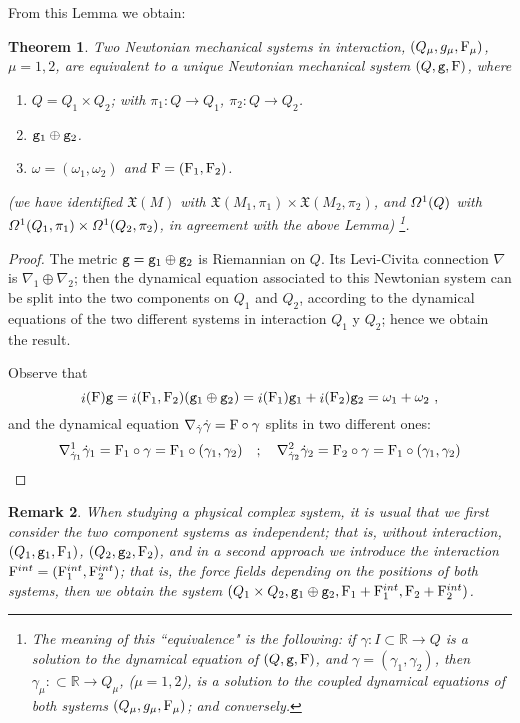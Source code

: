 \documentclass[12pt]{report}
\newtheorem{teor}{Theorem}[chapter]
\newtheorem{remark}[teor]{Remark}
\def\ben{\begin{enumerate}}
\def\een{\end{enumerate}}
\def\qed{\ifvmode\removelastskip\fi
{\unskip\nobreak\hfil\penalty50\hbox{}\nobreak\hfil
\hbox{\vrule height1.2ex width1.2ex}\parfillskip=0pt
\finalhyphendemerits=0 \par\smallskip}}
\def\vf{\mathfrak X}
\def\df{{\mit\Omega}}
\def\Real{\mathbb{R}}
\def\inn{\mathop{i}\nolimits}
\begin{document}
From this Lemma we obtain:

\begin{teor}
Two Newtonian mechanical systems in interaction,
$(Q_\mu,g_\mu,{\rm F}_\mu)$, $\mu=1,2$, are equivalent to a unique Newtonian mechanical system
 $(Q,{\tt g},{\rm F})$, where
\ben
\item
$Q=Q_1\times Q_2$; with $\pi_1\colon Q\to Q_1$, $\pi_2\colon Q\to Q_2$.
\item
${\tt g}_1\oplus {\tt g}_2$.
\item
$\omega=(\omega_1,\omega_2)$ and ${\rm F}=({\rm F}_1,{\rm F}_2)$.
\een
(we have identified
$\vf (M)$ with $\vf (M_1,\pi_1)\times\vf (M_2,\pi_2)$, and
$\df^1(Q)$ with $\df^1(Q_1,\pi_1)\times\df^1(Q_2,\pi_2)$,
in agreement with the above Lemma)
\footnote{
The meaning of this ``equivalence" is the following:
if $\gamma\colon I\subset\Real\to Q$ is a solution to the dynamical equation of $(Q,{\tt g},{\rm F})$, and $\gamma=(\gamma_1,\gamma_2)$,
then $\gamma_\mu\colon\subset\Real\to Q_\mu$, ($\mu=1,2$),
is a solution to the coupled dynamical equations of both systems $(Q_\mu,g_\mu,{\rm F}_\mu)$;
and conversely.
}.
\end{teor}
\begin{proof}
The metric ${\tt g}={\tt g}_1\oplus{\tt g}_2$ is Riemannian on $Q$. Its Levi-Civita connection $\nabla$ is $\nabla_1\oplus\nabla_2$;
then the dynamical equation associated to this Newtonian system can be split into the two components  on $Q_1$ and $Q_2$,
 according to the dynamical equations of the two different systems in interaction $Q_1$ y $Q_2$; hence we obtain the result.

Observe that
$$
\inn({\rm F}){\tt g}=\inn({\rm F}_1,{\rm F}_2)({\tt g}_1\oplus {\tt g}_2)=
\inn({\rm F}_1){\tt g}_1+\inn({\rm F}_2){\tt g}_2=\omega_1+\omega_2 \ ,
$$
and the dynamical equation $\nabla_{\dot\gamma}\dot\gamma={\rm F}\circ\gamma$ 
splits in two different ones:
$$
\nabla^1_{\dot\gamma_1}\dot\gamma_1={\rm F}_1\circ\gamma={\rm F}_1\circ(\gamma_1,\gamma_2)
\quad ; \quad
\nabla^2_{\dot\gamma_2}\dot\gamma_2={\rm F}_2\circ\gamma={\rm F}_1\circ(\gamma_1,\gamma_2)
$$
\qed \end{proof}

\begin{remark}{\rm 
When studying a physical complex system, it is usual that we first consider the two component systems as independent; that is,
without interaction, $(Q_1,{\tt g}_1,{\rm F}_1)$, $(Q_2,{\tt g}_2,{\rm F}_2)$, and in a second approach we introduce the interaction
${\rm F}^{int}=({\rm F}^{int}_1,{\rm F}^{int}_2)$; that is, the force fields depending on the positions of both systems, then we obtain the system $(Q_1\times Q_2,{\tt g}_1\oplus {\tt g}_2,{\rm F}_1+{\rm F}^{int}_1,{\rm F}_2+{\rm F}^{int}_2)$.
}\end{remark}
\end{document}
